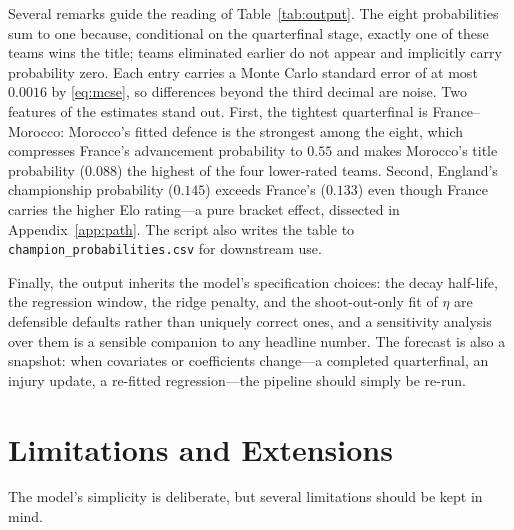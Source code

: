 \documentclass[11pt]{article}
\begin{document}
Several remarks guide the reading of Table~\ref{tab:output}. The eight
probabilities sum to one because, conditional on the quarterfinal stage,
exactly one of these teams wins the title; teams eliminated earlier do not
appear and implicitly carry probability zero. Each entry carries a Monte
Carlo standard error of at most $0.0016$ by \eqref{eq:mcse}, so differences
beyond the third decimal are noise. Two features of the estimates stand out.
First, the tightest quarterfinal is France--Morocco: Morocco's fitted
defence is the strongest among the eight, which compresses France's
advancement probability to $0.55$ and makes Morocco's title probability
($0.088$) the highest of the four lower-rated teams. Second, England's
championship probability ($0.145$) exceeds France's ($0.133$) even though
France carries the higher Elo rating---a pure bracket effect, dissected in
Appendix~\ref{app:path}. The script also writes the table to
\texttt{champion\_probabilities.csv} for downstream use.

Finally, the output inherits the model's specification choices: the decay
half-life, the regression window, the ridge penalty, and the shoot-out-only
fit of $\eta$ are defensible defaults rather than uniquely correct ones, and
a sensitivity analysis over them is a sensible companion to any headline
number. The forecast is also a snapshot: when covariates or coefficients
change---a completed quarterfinal, an injury update, a re-fitted
regression---the pipeline should simply be re-run.

\section{Limitations and Extensions}
\label{sec:limitations}

The model's simplicity is deliberate, but several limitations should be kept
in mind.
\end{document}
